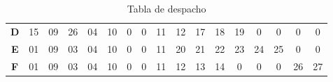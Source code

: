\documentclass[12pt, twoside, openright]{report} %
\begin{document}
\begin{table}[H]
\begin{tabular}{ccccccccccccccccc}
		\multicolumn{1}{c|}{\textbf{D}} & \multicolumn{1}{c|}{15} & \multicolumn{1}{c|}{09} & \multicolumn{1}{c|}{26} & \multicolumn{1}{c|}{04} & \multicolumn{1}{c|}{10}                        & \multicolumn{1}{c|}{\cellcolor[HTML]{C0C0C0}0} & \multicolumn{1}{c|}{\cellcolor[HTML]{C0C0C0}0} & \multicolumn{1}{c|}{11}                        & \multicolumn{1}{c|}{12}                        & \multicolumn{1}{c|}{17}                        & \multicolumn{1}{c|}{18}                        & \multicolumn{1}{c|}{19}                        & \multicolumn{1}{c|}{\cellcolor[HTML]{C0C0C0}0} & \multicolumn{1}{c|}{\cellcolor[HTML]{C0C0C0}0} & \multicolumn{1}{c|}{\cellcolor[HTML]{C0C0C0}0} & \multicolumn{1}{c|}{\cellcolor[HTML]{C0C0C0}0} \\ \cline{2-17}
		\multicolumn{1}{c|}{\textbf{E}} & \multicolumn{1}{c|}{01} & \multicolumn{1}{c|}{09} & \multicolumn{1}{c|}{03} & \multicolumn{1}{c|}{04} & \multicolumn{1}{c|}{10}                        & \multicolumn{1}{c|}{\cellcolor[HTML]{C0C0C0}0} & \multicolumn{1}{c|}{\cellcolor[HTML]{C0C0C0}0} & \multicolumn{1}{c|}{11}                        & \multicolumn{1}{c|}{20}                        & \multicolumn{1}{c|}{21}                        & \multicolumn{1}{c|}{22}                        & \multicolumn{1}{c|}{23}                        & \multicolumn{1}{c|}{24}                        & \multicolumn{1}{c|}{25}                        & \multicolumn{1}{c|}{\cellcolor[HTML]{C0C0C0}0} & \multicolumn{1}{c|}{\cellcolor[HTML]{C0C0C0}0} \\ \cline{2-17}
		\multicolumn{1}{c|}{\textbf{F}} & \multicolumn{1}{c|}{01} & \multicolumn{1}{c|}{09} & \multicolumn{1}{c|}{03} & \multicolumn{1}{c|}{04} & \multicolumn{1}{c|}{10}                        & \multicolumn{1}{c|}{\cellcolor[HTML]{C0C0C0}0} & \multicolumn{1}{c|}{\cellcolor[HTML]{C0C0C0}0} & \multicolumn{1}{c|}{11}                        & \multicolumn{1}{c|}{12}                        & \multicolumn{1}{c|}{13}                        & \multicolumn{1}{c|}{14}                        & \multicolumn{1}{c|}{\cellcolor[HTML]{C0C0C0}0} & \multicolumn{1}{c|}{\cellcolor[HTML]{C0C0C0}0} & \multicolumn{1}{c|}{\cellcolor[HTML]{C0C0C0}0} & \multicolumn{1}{c|}{26}                        & \multicolumn{1}{c|}{27}                        \\ \cline{2-17}
	\end{tabular}
	\caption{Tabla de despacho}
\end{table}
\end{document}
